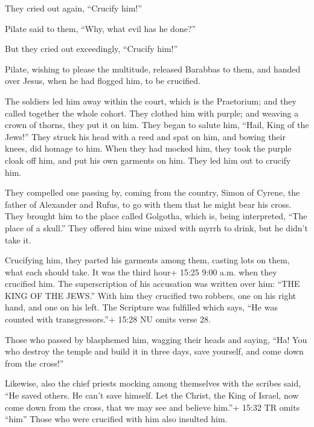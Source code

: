 They cried out again, ``Crucify him!''

 Pilate said to them, ``Why, what evil has he done?''

But they cried out exceedingly, ``Crucify him!''

 Pilate, wishing to please the multitude, released Barabbas
to them, and handed over Jesus, when he had flogged him, to be
crucified.

 The soldiers led him away within the court, which is the
Praetorium; and they called together the whole cohort. 
They clothed him with purple; and weaving a crown of thorns, they put it
on him.  They began to salute him, ``Hail, King of the
Jews!''  They struck his head with a reed and spat on him,
and bowing their knees, did homage to him.  When they had
mocked him, they took the purple cloak off him, and put his own garments
on him. They led him out to crucify him.

 They compelled one passing by, coming from the country,
Simon of Cyrene, the father of Alexander and Rufus, to go with them that
he might bear his cross.  They brought him to the place
called Golgotha, which is, being interpreted, ``The place of a skull.''
 They offered him wine mixed with myrrh to drink, but he
didn't take it.

 Crucifying him, they parted his garments among them,
casting lots on them, what each should take.  It was the
third hour+ 15:25 9:00 a.m. when they crucified him.  The
superscription of his accusation was written over him: ``THE KING OF THE
JEWS.''  With him they crucified two robbers, one on his
right hand, and one on his left.  The Scripture was
fulfilled which says, ``He was counted with transgressors.''+ 15:28 NU
omits verse 28.

 Those who passed by blasphemed him, wagging their heads
and saying, ``Ha! You who destroy the temple and build it in three days,
 save yourself, and come down from the cross!''

 Likewise, also the chief priests mocking among themselves
with the scribes said, ``He saved others. He can't save himself.
 Let the Christ, the King of Israel, now come down from the
cross, that we may see and believe him.''+ 15:32 TR omits ``him'' Those
who were crucified with him also insulted him.

